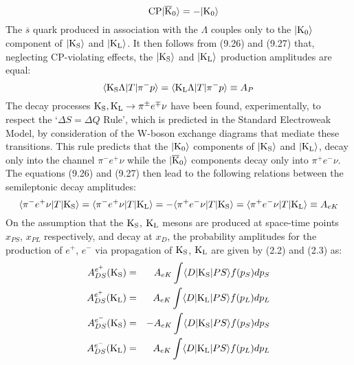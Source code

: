 {\[   ~~~{\rm CP} |{\rm \overline{K}_0}\rangle = -|{\rm K_0}\rangle\]
    The  $\overline{s}$ quark produced in association with the $\Lambda$ couples only to the  $|{\rm K_0}\rangle$
    component of  $|{\rm K_S}\rangle$ and $|{\rm K_L}\rangle$. It then follows from (9.26) and (9.27) that, neglecting
     CP-violating effects, the  $|{\rm K_S}\rangle$ and $|{\rm K_L}\rangle$ production amplitudes are equal:
     \begin{equation}
      \langle{\rm K_S}\Lambda|T|\pi^- p \rangle =  \langle{\rm K_L}\Lambda|T|\pi^- p \rangle \equiv A_P
     \end{equation}
     The decay processes  ${\rm K_S},{\rm K_L} \rightarrow \pi^{\pm}e^{\mp} \nu$ have been found, experimentally, to 
    respect the `$\Delta S = \Delta Q$ Rule', which is predicted in the Standard Electroweak Model, by consideration
   of the W-boson exchange diagrams that mediate these transitions. This rule predicts that the  $|{\rm K_0}\rangle$
    components of  $|{\rm K_S}\rangle$ and $|{\rm K_L}\rangle$, decay only into the channel $\pi^- e^+ \nu$ while 
    the $|{\rm \overline{K}_0}\rangle$ components decay only into $\pi^+ e^- \nu$. The equations (9.26) and
     (9.27) then lead to the following relations between the semileptonic decay amplitudes:
      \begin{equation}
  \langle \pi^- e^+ \nu |T|{\rm K_S} \rangle = \langle \pi^- e^+ \nu |T|{\rm K_L} \rangle 
    = - \langle \pi^+ e^- \nu |T|{\rm K_S} \rangle =  \langle \pi^+ e^- \nu |T|{\rm K_L} \rangle \equiv A_{eK}
     \end{equation}
     On the assumption that the  ${\rm K_S}$, ${\rm K_L}$ mesons are produced at space-time points
    $x_{PS}$,  $x_{PL}$ respectively, and decay at  $x_D$, the probability amplitudes for the production
    of $e^+$, $e^-$ via propagation of ${\rm K_S}$, ${\rm K_L}$ are given by (2.2) and (2.3) as:
     \begin{eqnarray}
     A_{DS}^{e^+}({\rm K_S}) & = & A_{eK}\int \langle D |{\rm K_S}| PS  \rangle f(p_S) d p_S   \\
      A_{DS}^{e^+}({\rm K_L}) & = & A_{eK}\int \langle D |{\rm K_L}| PS  \rangle f(p_L) d p_L  \\
    A_{DS}^{e^-}({\rm K_S}) & = & - A_{eK}\int \langle D |{\rm K_S}| PS  \rangle f(p_S) d p_S   \\
       A_{DS}^{e^-}({\rm K_L}) & = & A_{eK}\int \langle D |{\rm K_L}| PS  \rangle f(p_L) d p_L  
  \end{eqnarray}

}

